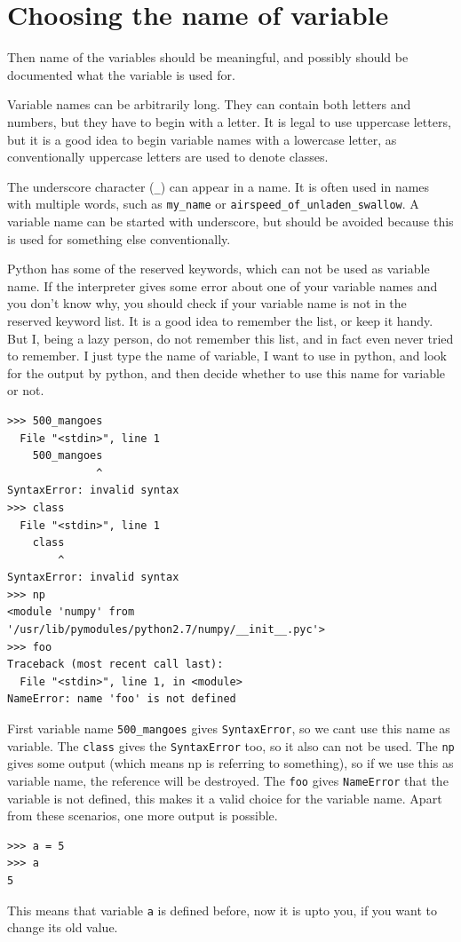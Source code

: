 \documentclass[10pt]{book}
\begin{document}
{\section{Choosing the name of variable}
Then name of the variables should be meaningful, and possibly should be documented what the variable is used for. 

Variable names can be arbitrarily long.  They can contain both letters and numbers, but they have to begin with a letter.
It is legal to use uppercase letters, but it is a good idea to begin variable names with a lowercase letter, as conventionally uppercase letters are used to denote classes. 

The underscore character (\verb"_") can appear in a name. It is often used in names with multiple words, such as
\verb"my_name" or \verb"airspeed_of_unladen_swallow". A variable name can be started with underscore, but should be avoided because this is used for something else conventionally. 

Python has some of the reserved keywords, which can not be used as variable name. If the interpreter gives some error about one of your variable names and you don't know why, you should check if your variable name is not in the reserved keyword list. It is a good idea to remember the list, or keep it handy. But I, being a lazy person, do not remember this list, and in fact even never tried to remember. I just type the name of variable, I want to use in python, and look for the output by python, and then decide whether to use this name for variable or not.

\beforeverb
\begin{verbatim}
>>> 500_mangoes 
  File "<stdin>", line 1
    500_mangoes 
              ^
SyntaxError: invalid syntax
>>> class
  File "<stdin>", line 1
    class
        ^
SyntaxError: invalid syntax
>>> np
<module 'numpy' from '/usr/lib/pymodules/python2.7/numpy/__init__.pyc'>
>>> foo
Traceback (most recent call last):
  File "<stdin>", line 1, in <module>
NameError: name 'foo' is not defined
\end{verbatim}
\afterverb
First variable name \verb"500_mangoes" gives \verb"SyntaxError", so we cant use this name as variable. The \verb"class" gives the \verb"SyntaxError" too, so it also can not be used. The \verb"np" gives some output (which means np is referring to something), so if we use this as variable name, the reference will be destroyed. The \verb"foo" gives \verb"NameError" that the variable is not defined, this makes it a valid choice for the variable name. Apart from these scenarios, one more output is possible. 
\beforeverb
\begin{verbatim}
>>> a = 5
>>> a
5
\end{verbatim}
\afterverb
This means that variable \verb"a" is defined before, now it is upto you, if you want to change its old value.

}
\end{document}
